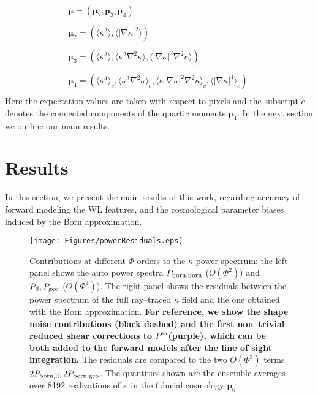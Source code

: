 \documentclass[reprint,aps,prd,superscriptaddress,showkeys,showpacs]{revtex4-1}
\newcommand{\bb}[1]{\mathbf{#1}}
\begin{document}
\begin{equation}
\label{par:moments}
\begin{matrix}
\pmb{\mu} = (\pmb{\mu}_2,\pmb{\mu}_3,\pmb{\mu}_4) \\ \\
\pmb{\mu}_2 = \left(\langle\kappa^2\rangle,\langle\vert\nabla\kappa\vert^2\rangle\right) \\ \\
\pmb{\mu}_3 = \left(\langle\kappa^3\rangle,\langle\kappa^2\nabla^2\kappa\rangle,\langle\vert\nabla\kappa\vert^2\nabla^2\kappa\rangle\right) \\ \\
\pmb{\mu}_4 = \left(\langle\kappa^4\rangle_c,\langle\kappa^3\nabla^2\kappa\rangle_c,\langle\kappa\vert\nabla\kappa\vert^2\nabla^2\kappa\rangle_c,\langle\vert\nabla\kappa\vert^4\rangle_c\right).\\
\end{matrix}
\end{equation} 
%
Here the expectation values are taken with respect to pixels and the subscript $c$ denotes the connected components of the quartic moments $\pmb{\mu}_4$. In the next section we outline our main results.  


\section{Results}
\label{sec:results}
% 
In this section, we present the main results of this work, regarding accuracy of forward modeling the WL features, and the cosmological parameter biases induced by the Born approximation.

\begin{figure*}
\begin{center}
\texttt{[image: Figures/powerResiduals.eps]}
\end{center}
\caption{Contributions at different $\Phi$ orders to the $\kappa$ power spectrum: the left panel shows the auto power spectra $P_{\rm born,born}$ ($O(\Phi^2)$) and $P_{\rm ll},P_{\rm geo}$ ($O(\Phi^4)$). The right panel shows the residuals between the power spectrum of the full ray--traced $\kappa$ field and the one obtained with the Born approximation. \textbf{\color{red} For reference, we show the shape noise contributions (black dashed) and the first non--trivial reduced shear corrections to $P^{\kappa\kappa}$(purple), which can be both added to the forward models after the line of sight integration.} The residuals are compared to the two $O(\Phi^3)$ terms $2P_{\rm born,ll},2P_{\rm born,geo}$. The quantities shown are the ensemble averages over 8192 realizations of $\kappa$ in the fiducial cosmology $\bb{p}_0$.}
\label{fig:psResiduals}
\end{figure*}
\end{document}
